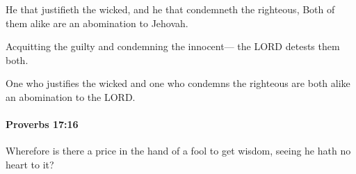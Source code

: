 			\begin{versebox}
					\item[BHS] 
					\item[ASV] He that justifieth the wicked, and he that condemneth the righteous, Both of them alike are an abomination to Jehovah.
					\item[NIV] Acquitting the guilty and condemning the innocent— the LORD detests them both.
					\item[NRSV] One who justifies the wicked and one who condemns the righteous are both alike an abomination to the LORD.
			\end{versebox}

		\paragraph{Proverbs 17:16} %
			\label{PROVERBS-17-16}

			Wherefore is there a price in the hand of a fool to get wisdom, seeing he hath no heart to it?

